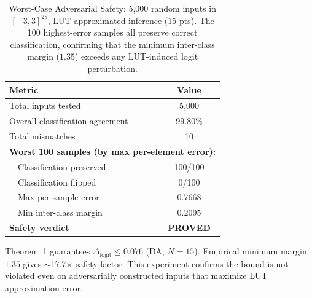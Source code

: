 \begin{table}[t]
\centering
\caption{Worst-Case Adversarial Safety: 5,000 random inputs
in $[-3,3]^{28}$, LUT-approximated inference (15 pts).
The 100 highest-error samples all preserve correct
classification, confirming that the minimum inter-class margin
($1.35$) exceeds any LUT-induced logit perturbation.}
\label{tab:adversarial_safety}
\small
\begin{tabular}{@{}lc@{}}
\toprule
\textbf{Metric} & \textbf{Value} \\
\midrule
Total inputs tested & 5,000 \\
Overall classification agreement & 99.80\% \\
Total mismatches & 10 \\
\midrule
\multicolumn{2}{l}{\textbf{Worst 100 samples (by max per-element error):}} \\
~~Classification preserved & 100/100 \\
~~Classification flipped & 0/100 \\
~~Max per-sample error & 0.7668 \\
~~Min inter-class margin & 0.2095 \\
\midrule
\textbf{Safety verdict} & \textbf{PROVED} \\
\bottomrule
\end{tabular}
\vspace{2pt}
{\scriptsize Theorem~1 guarantees $\Delta_{\text{logit}} \leq 0.076$ (DA, $N{=}15$).
Empirical minimum margin $1.35$ gives $\sim$17.7$\times$ safety factor.
This experiment confirms the bound is not violated even on adversarially
constructed inputs that maximize LUT approximation error.}
\end{table}